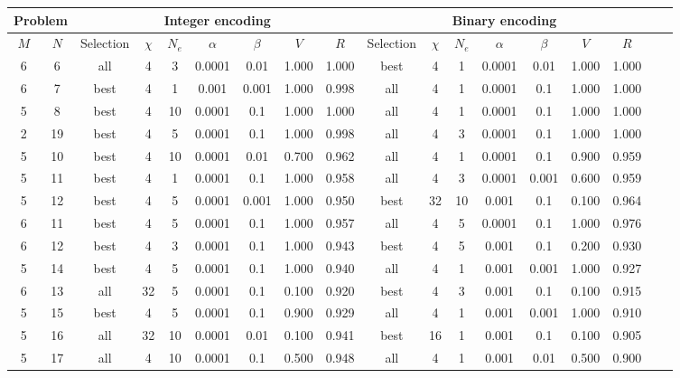 \begin{table*}[!h]
    \centering
    \begin{tabular}{|c|c||c|c|c|c|c|c|c||c|c|c|c|c|c|c|c|c|}
        \hline
        \multicolumn{2}{|c||}{Problem} & \multicolumn{7}{c||}{Integer encoding} & \multicolumn{7}{c|}{Binary encoding} \\
        \hline
        $M$ & $N$ & Selection & $\chi$ & $N_e$ &$\alpha$ & $\beta$ & $V$ &  $R$ & Selection & $\chi$ & $N_e$ &$\alpha$ & $\beta$ & $V$ &  $R$\\
        \hline \hline
6 & 6 & all & 4 & 3 & 0.0001 & 0.01 & 1.000 & 1.000 &best & 4 & 1 & 0.0001 & 0.01 & 1.000 & 1.000 \\ \hline
6 & 7 & best & 4 & 1 & 0.001 & 0.001 & 1.000 & 0.998 &all & 4 & 1 & 0.0001 & 0.1 & 1.000 & 1.000 \\ \hline
5 & 8 & best & 4 & 10 & 0.0001 & 0.1 & 1.000 & 1.000 &all & 4 & 1 & 0.0001 & 0.1 & 1.000 & 1.000 \\ \hline
2 & 19 & best & 4 & 5 & 0.0001 & 0.1 & 1.000 & 0.998 &all & 4 & 3 & 0.0001 & 0.1 & 1.000 & 1.000 \\ \hline
5 & 10 & best & 4 & 10 & 0.0001 & 0.01 & 0.700 & 0.962 &all & 4 & 1 & 0.0001 & 0.1 & 0.900 & 0.959 \\ \hline
5 & 11 & best & 4 & 1 & 0.0001 & 0.1 & 1.000 & 0.958 &all & 4 & 3 & 0.0001 & 0.001 & 0.600 & 0.959 \\ \hline
5 & 12 & best & 4 & 5 & 0.0001 & 0.001 & 1.000 & 0.950 &best & 32 & 10 & 0.001 & 0.1 & 0.100 & 0.964 \\ \hline
6 & 11 & best & 4 & 5 & 0.0001 & 0.1 & 1.000 & 0.957 &all & 4 & 5 & 0.0001 & 0.1 & 1.000 & 0.976 \\ \hline
6 & 12 & best & 4 & 3 & 0.0001 & 0.1 & 1.000 & 0.943 &best & 4 & 5 & 0.001 & 0.1 & 0.200 & 0.930 \\ \hline
5 & 14 & best & 4 & 5 & 0.0001 & 0.1 & 1.000 & 0.940 &all & 4 & 1 & 0.001 & 0.001 & 1.000 & 0.927 \\ \hline
6 & 13 & all & 32 & 5 & 0.0001 & 0.1 & 0.100 & 0.920 &best & 4 & 3 & 0.001 & 0.1 & 0.100 & 0.915 \\ \hline
5 & 15 & best & 4 & 5 & 0.0001 & 0.1 & 0.900 & 0.929 &all & 4 & 1 & 0.001 & 0.001 & 1.000 & 0.910 \\ \hline
5 & 16 & all & 32 & 10 & 0.0001 & 0.01 & 0.100 & 0.941 &best & 16 & 1 & 0.001 & 0.1 & 0.100 & 0.905 \\ \hline
5 & 17 & all & 4 & 10 & 0.0001 & 0.1 & 0.500 & 0.948 &all & 4 & 1 & 0.001 & 0.01 & 0.500 & 0.900 \\ \hline

\end{tabular}
\end{table*}
